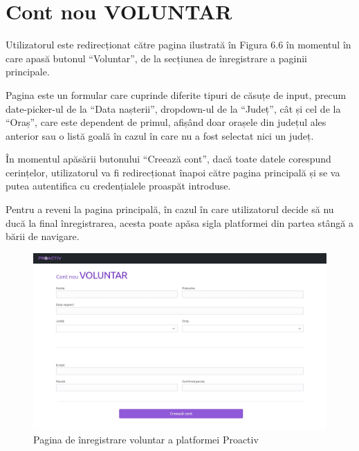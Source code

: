 \documentclass[12pt,a4paper]{report}
\begin{document}
\section{Cont nou VOLUNTAR}
\par
Utilizatorul este redirecționat către pagina ilustrată în Figura 6.6 în momentul în care apasă butonul “Voluntar”, de la secțiunea de înregistrare a paginii principale.
\\\par
Pagina este un formular care cuprinde diferite tipuri de căsuțe de input, precum date-picker-ul de la “Data nașterii”, dropdown-ul de la “Județ”, cât și cel de la “Oraș”, care este dependent de primul, afișând doar orașele din județul ales anterior sau o listă goală în cazul în care nu a fost selectat nici un județ.
\\\par
În momentul apăsării butonului “Creează cont”, dacă toate datele corespund cerințelor, utilizatorul va fi redirecționat înapoi către pagina principală și se va putea autentifica cu credențialele proaspăt introduse.
\\\par
Pentru a reveni la pagina principală, în cazul în care utilizatorul decide să nu ducă la final înregistrarea, acesta poate apăsa sigla platformei din partea stângă a bării de navigare.
\\
\begin{figure}[H]
\centering
  \includegraphics[width=1\linewidth]{./imagini/contvol.jpg}
  \caption{Pagina de înregistrare voluntar a platformei Proactiv}
\end{figure}

\newpage
\end{document}
